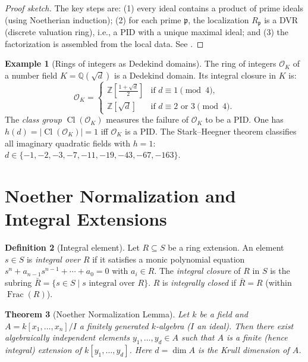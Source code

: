 \documentclass[12pt,a4paper]{amsart}
\newtheorem{theorem}{Theorem}[section]
\theoremstyle{definition}
\newtheorem{definition}[theorem]{Definition}
\newtheorem{example}[theorem]{Example}
\theoremstyle{definition}
\DeclareMathOperator{\Frac}{Frac}
\DeclareMathOperator{\Cl}{Cl}
\begin{document}
\begin{proof}[Proof sketch]
The key steps are: (1) every ideal contains a product of prime ideals (using
Noetherian induction); (2) for each prime $\mathfrak{p}$, the localization $R_\mathfrak{p}$
is a DVR (discrete valuation ring), i.e., a PID with a unique maximal ideal; and
(3) the factorization is assembled from the local data. See \cite{Neukirch1999}.
\end{proof}

\begin{example}[Rings of integers as Dedekind domains]
The ring of integers $\mathcal{O}_K$ of a number field $K = \mathbb{Q}(\sqrt{d})$ is
a Dedekind domain. Its integral closure in $K$ is:
\[
  \mathcal{O}_K = \begin{cases}
    \mathbb{Z}\!\left[\tfrac{1+\sqrt{d}}{2}\right] & \text{if } d \equiv 1 \pmod 4, \\
    \mathbb{Z}[\sqrt{d}] & \text{if } d \equiv 2 \text{ or } 3 \pmod 4.
  \end{cases}
\]
The \emph{class group} $\Cl(\mathcal{O}_K)$ measures the failure of $\mathcal{O}_K$
to be a PID. One has $h(d) = |\Cl(\mathcal{O}_K)| = 1$ iff $\mathcal{O}_K$ is a PID.
The Stark--Heegner theorem classifies all imaginary quadratic fields with $h = 1$:
$d \in \{-1, -2, -3, -7, -11, -19, -43, -67, -163\}$.
\end{example}

\section{Noether Normalization and Integral Extensions}

\begin{definition}[Integral element]
Let $R \subseteq S$ be a ring extension. An element $s \in S$ is \emph{integral over $R$}
if it satisfies a monic polynomial equation $s^n + a_{n-1}s^{n-1} + \cdots + a_0 = 0$
with $a_i \in R$. The \emph{integral closure} of $R$ in $S$ is the subring
$\bar{R} = \{s \in S \mid s \text{ integral over } R\}$.
$R$ is \emph{integrally closed} if $\bar{R} = R$ (within $\Frac(R)$).
\end{definition}

\begin{theorem}[Noether Normalization Lemma]
Let $k$ be a field and $A = k[x_1,\ldots,x_n]/I$ a finitely generated $k$-algebra
($I$ an ideal). Then there exist algebraically independent elements
$y_1,\ldots,y_d \in A$ such that $A$ is a finite (hence integral) extension of
$k[y_1,\ldots,y_d]$. Here $d = \dim A$ is the Krull dimension of $A$.
\end{theorem}
\end{document}
